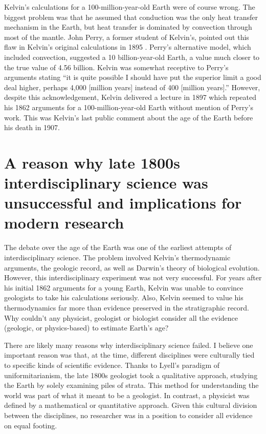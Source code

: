 \documentclass[12pt]{article}
\begin{document}
Kelvin's calculations for a 100-million-year-old Earth were of course wrong. The biggest problem was that he assumed that conduction was the only heat transfer mechanism in the Earth, but heat transfer is dominated by convection through most of the mantle. John Perry, a former student of Kelvin's, pointed out this flaw in Kelvin's original calculations in 1895 \citep{England_2007}. Perry's alternative model, which included convection, suggested a 10 billion-year-old Earth, a value much closer to the true value of 4.56 billion. Kelvin was somewhat receptive to Perry's arguments stating ``it is quite possible I should have put the superior limit a good deal higher, perhaps 4,000 [million years] instead of 400 [million years].'' However, despite this acknowledgement, Kelvin delivered a lecture in 1897 which repeated his 1862 arguments for a 100-million-year-old Earth without mention of Perry's work. This was Kelvin's last public comment about the age of the Earth before his death in 1907.

\section{A reason why late 1800s interdisciplinary science was unsuccessful and implications for modern research} \label{sec:3}

The debate over the age of the Earth was one of the earliest attempts of interdisciplinary science. The problem involved Kelvin's thermodynamic arguments, the geologic record, as well as Darwin's theory of biological evolution. However, this interdisciplinary experiment was not very successful. For years after his initial 1862 arguments for a young Earth, Kelvin was unable to convince geologists to take his calculations seriously. Also, Kelvin seemed to value his thermodynamics far more than evidence preserved in the stratigraphic record. Why couldn't any physicist, geologist or biologist consider all the evidence (geologic, or physics-based) to estimate Earth's age?

There are likely many reasons why interdisciplinary science failed. I believe one important reason was that, at the time, different disciplines were culturally tied to specific kinds of scientific evidence. Thanks to Lyell's paradigm of uniformitarianism, the late 1800s geologist took a qualitative approach, studying the Earth by solely examining piles of strata. This method for understanding the world was part of what it meant to be a geologist. In contrast, a physicist was defined by a mathematical or quantitative approach. Given this cultural division between the disciplines, no researcher was in a position to consider all evidence on equal footing.
\end{document}
